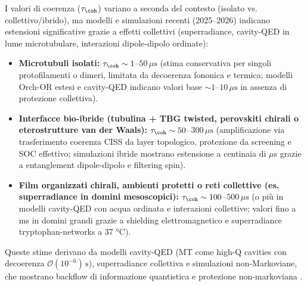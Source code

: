 \documentclass[11pt,a4paper]{article}
\let\oldcite\cite
\renewcommand{\cite}{\protect\oldcite}
\theoremstyle{plain}
\theoremstyle{definition}
\begin{document}
I valori di coerenza ($\tau_{\coh}$) variano a seconda del contesto (isolato vs. collettivo/ibrido), ma modelli e simulazioni recenti (2025--2026) indicano estensioni significative grazie a effetti collettivi (superradiance, cavity-QED in lume microtubulare, interazioni dipole-dipolo ordinate):

\begin{itemize}
    \item \textbf{Microtubuli isolati:} $\tau_{\coh} \sim 1$--$50\,\mu\mathrm{s}$ (stima conservativa per singoli protofilamenti o dimeri, limitata da decoerenza fononica e termica; modelli Orch-OR estesi e cavity-QED indicano valori base $\sim 1$--$10\,\mu\mathrm{s}$ in assenza di protezione collettiva).

    \item \textbf{Interfacce bio-ibride (tubulina + TBG twisted, perovskiti chirali o eterostrutture van der Waals):} $\tau_{\coh} \sim 50$--$300\,\mu\mathrm{s}$ (amplificazione via trasferimento coerenza CISS da layer topologico, protezione da screening e SOC effettivo; simulazioni ibride mostrano estensione a centinaia di $\mu$s grazie a entanglement dipole-dipolo e filtering spin).

    \item \textbf{Film organizzati chirali, ambienti protetti o reti collettive (es. superradiance in domini mesoscopici):} $\tau_{\coh} \sim 100$--$500\,\mu\mathrm{s}$ (o più in modelli cavity-QED con acqua ordinata e interazioni collettive; valori fino a ms in domini grandi grazie a shielding elettromagnetico e superradiance tryptophan-networks a 37 °C).
\end{itemize}

Queste stime derivano da modelli cavity-QED (MT come high-Q cavities con decoerenza $\mathcal{O}(10^{-6})\,\mathrm{s}$), superradiance collettiva e simulazioni non-Markoviane, che mostrano backflow di informazione quantistica e protezione non-markoviana \cite{eckelmann2023chiral, rohmer2025chiral, levy2025quantum, mavromatos2025microtubules}.
\end{document}
